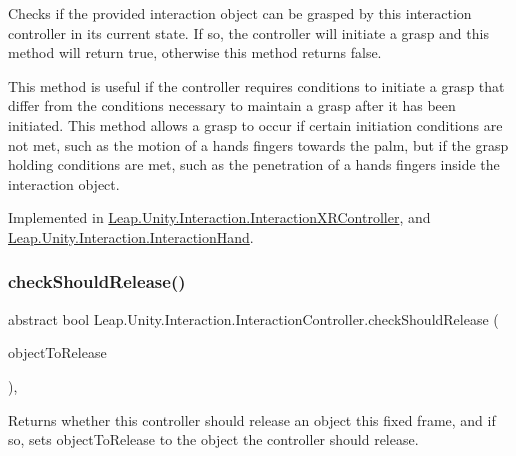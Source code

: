 Checks if the provided interaction object can be grasped by this interaction controller in its current state. If so, the controller will initiate a grasp and this method will return true, otherwise this method returns false. 

This method is useful if the controller requires conditions to initiate a grasp that differ from the conditions necessary to maintain a grasp after it has been initiated. This method allows a grasp to occur if certain initiation conditions are not met, such as the motion of a hand\textquotesingle{}s fingers towards the palm, but if the grasp holding conditions are met, such as the penetration of a hand\textquotesingle{}s fingers inside the interaction object. 

Implemented in \mbox{\hyperlink{class_leap_1_1_unity_1_1_interaction_1_1_interaction_x_r_controller_a4756d119b4d5a13574ed990e439e64f3}{Leap.\+Unity.\+Interaction.\+Interaction\+X\+R\+Controller}}, and \mbox{\hyperlink{class_leap_1_1_unity_1_1_interaction_1_1_interaction_hand_a278a920f19b3a940628ddf08c502c7e0}{Leap.\+Unity.\+Interaction.\+Interaction\+Hand}}.

\mbox{\label{class_leap_1_1_unity_1_1_interaction_1_1_interaction_controller_ac2f99423db66dad0d889723c6acff62f}} 
\subsubsection{\texorpdfstring{checkShouldRelease()}{checkShouldRelease()}}
{\footnotesize\ttfamily abstract bool Leap.\+Unity.\+Interaction.\+Interaction\+Controller.\+check\+Should\+Release (\begin{DoxyParamCaption}\item[{out \mbox{\hyperlink{interface_leap_1_1_unity_1_1_interaction_1_1_i_interaction_behaviour}{I\+Interaction\+Behaviour}}}]{object\+To\+Release }\end{DoxyParamCaption})\hspace{0.3cm}{\ttfamily [protected]}, {}}



Returns whether this controller should release an object this fixed frame, and if so, sets object\+To\+Release to the object the controller should release. 



